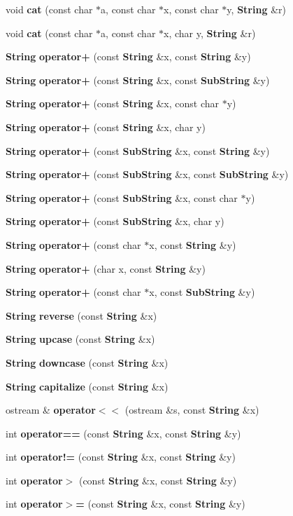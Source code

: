 \begin{CompactItemize}
\item 
void {\bf cat} (const char $\ast$a, const char $\ast$x, const char $\ast$y, {\bf String} \&r)
\item 
void {\bf cat} (const char $\ast$a, const char $\ast$x, char y, {\bf String} \&r)
\item 
{\bf String} {\bf operator+} (const {\bf String} \&x, const {\bf String} \&y)
\item 
{\bf String} {\bf operator+} (const {\bf String} \&x, const {\bf Sub\-String} \&y)
\item 
{\bf String} {\bf operator+} (const {\bf String} \&x, const char $\ast$y)
\item 
{\bf String} {\bf operator+} (const {\bf String} \&x, char y)
\item 
{\bf String} {\bf operator+} (const {\bf Sub\-String} \&x, const {\bf String} \&y)
\item 
{\bf String} {\bf operator+} (const {\bf Sub\-String} \&x, const {\bf Sub\-String} \&y)
\item 
{\bf String} {\bf operator+} (const {\bf Sub\-String} \&x, const char $\ast$y)
\item 
{\bf String} {\bf operator+} (const {\bf Sub\-String} \&x, char y)
\item 
{\bf String} {\bf operator+} (const char $\ast$x, const {\bf String} \&y)
\item 
{\bf String} {\bf operator+} (char x, const {\bf String} \&y)
\item 
{\bf String} {\bf operator+} (const char $\ast$x, const {\bf Sub\-String} \&y)
\item 
{\bf String} {\bf reverse} (const {\bf String} \&x)
\item 
{\bf String} {\bf upcase} (const {\bf String} \&x)
\item 
{\bf String} {\bf downcase} (const {\bf String} \&x)
\item 
{\bf String} {\bf capitalize} (const {\bf String} \&x)
\item 
ostream \& {\bf operator$<$$<$} (ostream \&s, const {\bf String} \&x)
\item 
int {\bf operator==} (const {\bf String} \&x, const {\bf String} \&y)
\item 
int {\bf operator!=} (const {\bf String} \&x, const {\bf String} \&y)
\item 
int {\bf operator$>$} (const {\bf String} \&x, const {\bf String} \&y)
\item 
int {\bf operator$>$=} (const {\bf String} \&x, const {\bf String} \&y)

\end{CompactItemize}

